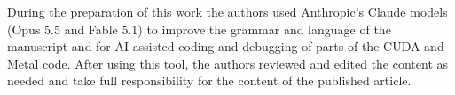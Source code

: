 \documentclass[gmd, manuscript]{copernicus}
\begin{document}

\begin{acknowledgements}
During the preparation of this work the authors used Anthropic's Claude
models (Opus 5.5 and Fable 5.1) to improve the grammar and language of the manuscript and for
AI-assisted coding and debugging of parts of the CUDA and Metal code. After using this
tool, the authors reviewed and edited the content as needed and take full
responsibility for the content of the published article.
\end{acknowledgements}





\end{document}

